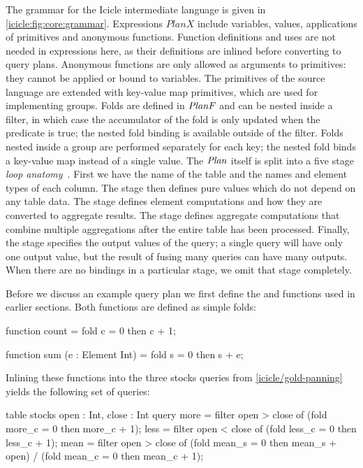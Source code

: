 The grammar for the Icicle intermediate language is given in \cref{icicle:fig:core:grammar}.
Expressions $PlanX$ include variables, values, applications of primitives and anonymous functions.
Function definitions and uses are not needed in expressions here, as their definitions are inlined before converting to query plans.
Anonymous functions are only allowed as arguments to primitives: they cannot be applied or bound to variables.
The primitives of the source language are extended with key-value map primitives, which are used for implementing groups.
Folds are defined in $\mathit{PlanF}$ and can be nested inside a filter, in which case the accumulator of the fold is only updated when the predicate is true; the nested fold binding is available outside of the filter.
Folds nested inside a group are performed separately for each key; the nested fold binds a key-value map instead of a single value.
The $\mathit{Plan}$ itself is split into a five stage \emph{loop anatomy}~\cite{shivers2005anatomy}.
First we have the name of the table and the names and element types of each column.
The \IcC@before@ stage then defines pure values which do not depend on any table data.
The \IcC@folds@ stage defines element computations and how they are converted to aggregate results.
The \IcC@after@ stage defines aggregate computations that combine multiple aggregations after the entire table has been processed.
Finally, the \IcC@return@ stage specifies the output values of the query; a single query will have only one output value, but the result of fusing many queries can have many outputs.
When there are no bindings in a particular stage, we omit that stage completely.


Before we discuss an example query plan we first define the \IcC@count@ and \IcC@sum@ functions used in earlier sections.
Both functions are defined as simple folds:
\begin{icicle}
function count
 = fold c = 0 then c + 1;

function sum (e : Element Int)
 = fold s = 0 then s + e;
\end{icicle}

Inlining these functions into the three stocks queries from \cref{icicle/gold-panning} yields the following set of queries:

\begin{icicle}
table stocks { open : Int, close : Int }
query 
  more = filter open > close of (fold more_c = 0 then more_c + 1);
  less = filter open < close of (fold less_c = 0 then less_c + 1);
  mean = filter open > close of
      (fold mean_s = 0 then mean_s + open)
    / (fold mean_c = 0 then mean_c + 1);
\end{icicle}

